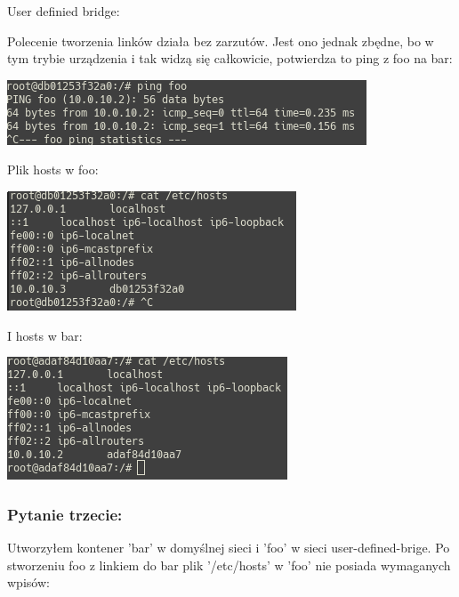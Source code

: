 \documentclass[12pt]{article}
\begin{document}
    {\Large User definied bridge:}

    Polecenie tworzenia linków działa bez zarzutów. Jest ono jednak zbędne, bo w tym trybie urządzenia i tak widzą się całkowicie, potwierdza to ping z foo na bar:

    \vspace{0.2cm}

    \includegraphics[width=\textwidth]{foobrping.png}

    Plik hosts w foo:

    \vspace{0.2cm}
    \includegraphics[width=\textwidth]{foobrhosts.png}

    I hosts w bar:

    \vspace{0.2cm}
    \includegraphics[width=\textwidth]{barbrhosts.png}

    \subsubsection{Pytanie trzecie:}

    Utworzyłem kontener 'bar' w domyślnej sieci i 'foo' w sieci user-defined-brige. Po stworzeniu foo z linkiem do bar plik '/etc/hosts' w 'foo' nie posiada wymaganych wpisów:
\end{document}
